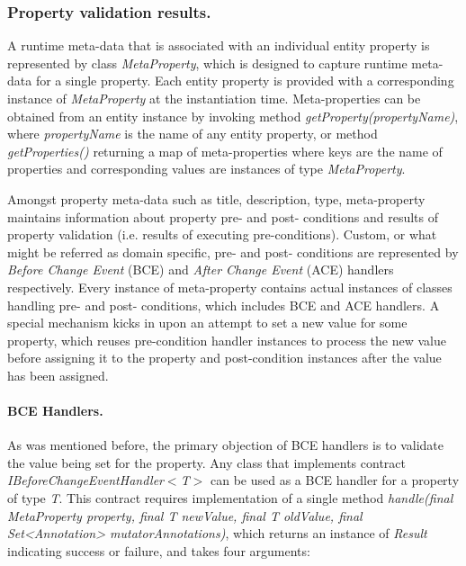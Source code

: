   \subsubsection*{Property validation results.}

  A runtime meta-data that is associated with an individual entity property is represented by class \emph{MetaProperty}, which is designed to capture runtime meta-data for a single property.
  Each entity property is provided with a corresponding instance of \emph{MetaProperty} at the instantiation time.
  Meta-properties can be obtained from an entity instance by invoking method \emph{getProperty(propertyName)}, where \emph{propertyName} is the name of any entity property, or method \emph{getProperties()} returning a map of meta-properties where keys are the name of properties and corresponding values are instances of type \emph{MetaProperty}.

  Amongst property meta-data such as title, description, type, meta-property maintains information about property pre- and post- conditions and results of property validation (i.e. results of executing pre-conditions).
  Custom, or what might be referred as domain specific, pre- and post- conditions are represented by \emph{Before Change Event} (BCE) and \emph{After Change Event} (ACE) handlers respectively.
  Every instance of meta-property contains actual instances of classes handling pre- and post- conditions, which includes BCE and ACE handlers.
  A special mechanism kicks in upon an attempt to set a new value for some property, which reuses pre-condition handler instances to process the new value before assigning it to the property and post-condition instances after the value has been assigned.

  \paragraph*{BCE Handlers.}
  As was mentioned before, the primary objection of BCE handlers is to validate the value being set for the property.
  Any class that implements contract \emph{IBeforeChangeEventHandler$<$T$>$} can be used as a BCE handler for a property of type \emph{T}.
  This contract requires implementation of a single method \emph{handle(final MetaProperty property, final T newValue, final T oldValue, final Set<Annotation> mutatorAnnotations)}, which returns an instance of \emph{Result} indicating success or failure, and takes four arguments:

